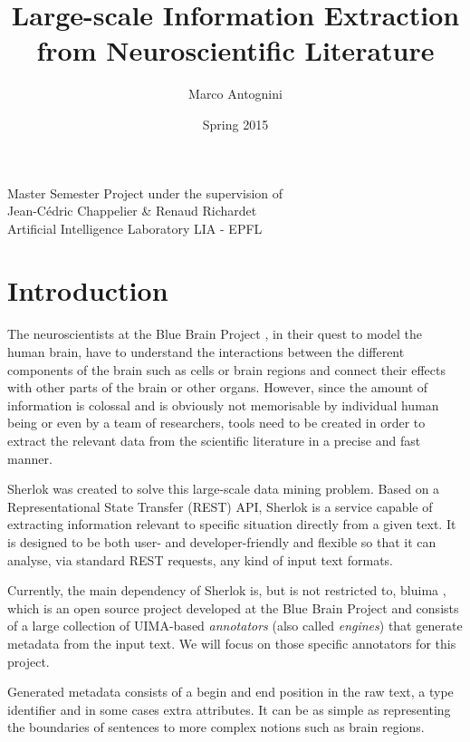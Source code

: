 \documentclass{article}
\title{Large-scale Information Extraction from Neuroscientific Literature}
\date{Spring 2015}
\author{Marco Antognini}
\begin{document}
\maketitle

\begin{center}
    Master Semester Project under the supervision of\\
    Jean-Cédric Chappelier \& Renaud Richardet\\
    Artificial Intelligence Laboratory LIA - EPFL
\end{center}

\newpage
{}


\tableofcontents

\section{Introduction}

The neuroscientists at the Blue Brain Project \cite{bbp}, in their quest to model the human brain,
have to understand the interactions between the different components of the brain such as cells or
brain regions and connect their effects with other parts of the brain or other organs.  However,
since the amount of information is colossal and is obviously not memorisable by individual human
being or even by a team of researchers, tools need to be created in order to extract the relevant
data from the scientific literature in a precise and fast manner.

Sherlok \cite{sherlok} was created to solve this large-scale data mining problem. Based on a
Representational State Transfer (REST) API, Sherlok is a service capable of extracting information
relevant to specific situation directly from a given text. It is designed to be both user- and
developer-friendly and flexible so that it can analyse, via standard REST requests, any kind of
input text formats.

Currently, the main dependency of Sherlok is, but is not restricted to, bluima \cite{bluima}, which
is an open source project developed at the Blue Brain Project and consists of a large collection of
UIMA-based \emph{annotators} (also called \emph{engines}) \cite{uima} that generate metadata from
the input text. We will focus on those specific annotators for this project.

Generated metadata consists of a begin and end position in the raw text, a type identifier and in
some cases extra attributes. It can be as simple as representing the boundaries of sentences to more
complex notions such as brain regions.
\end{document}
